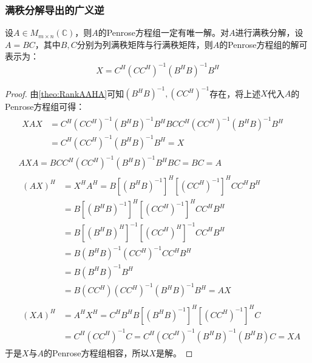 \subsubsection{满秩分解导出的广义逆}
\begin{theorem}
	设$A\in M_{m\times n}(\mathbb{C})$，则$A$的Penrose方程组一定有唯一解。对$A$进行满秩分解，设$A=BC$，其中$B,C$分别为列满秩矩阵与行满秩矩阵，则$A$的Penrose方程组的解可表示为：
	\begin{equation*}
		X=C^H(CC^H)^{-1}(B^HB)^{-1}B^H
	\end{equation*}
\end{theorem}
\begin{proof}
	由\cref{theo:RankAAHA}可知$(B^HB)^{-1},(CC^H)^{-1}$存在，将上述$X$代入$A$的Penrose方程组可得：
	\begin{align*}
		&\begin{aligned}
			XAX
			&=C^H(CC^H)^{-1}(B^HB)^{-1}B^HBCC^H(CC^H)^{-1}(B^HB)^{-1}B^H \\
			&=C^H(CC^H)^{-1}(B^HB)^{-1}B^H=X
		\end{aligned} \\
		&AXA=BCC^H(CC^H)^{-1}(B^HB)^{-1}B^HBC=BC=A \\
		&\begin{aligned}
			(AX)^H
			&=X^HA^H=B[(B^HB)^{-1}]^H[(CC^H)^{-1}]^HCC^HB^H \\
			&=B[(B^HB)^{-1}]^H[(CC^H)^{-1}]^HCC^HB^H \\
			&=B[(B^HB)^H]^{-1}[(CC^H)^H]^{-1}CC^HB^H \\
			&=B(B^HB)^{-1}(CC^H)^{-1}CC^HB^H \\
			&=B(B^HB)^{-1}B^H \\
			&=B(CC^H)(CC^H)^{-1}(B^HB)^{-1}B^H=AX
		\end{aligned} \\
		&\begin{aligned}
			(XA)^H
			&=A^HX^H=C^HB^HB[(B^HB)^{-1}]^H[(CC^H)^{-1}]^HC \\
			&=C^H(CC^H)^{-1}C=C^H(CC^H)^{-1}(B^HB)^{-1}(B^HB)C=XA
		\end{aligned}
	\end{align*}
	于是$X$与$A$的Penrose方程组相容，所以$X$是解。
\end{proof}
